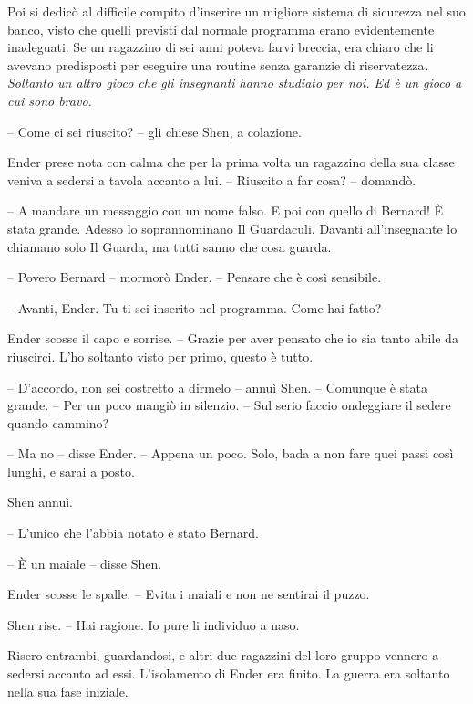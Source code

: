 {Poi si dedicò al difficile compito d'inserire un migliore sistema di
	sicurezza nel suo banco, visto che quelli previsti dal normale programma
	erano evidentemente inadeguati. Se un ragazzino di sei anni poteva farvi
	breccia, era chiaro che li avevano predisposti per eseguire una routine
	senza garanzie di riservatezza. \emph{Soltanto un altro gioco che gli
		insegnanti hanno studiato per noi. Ed è un gioco a cui sono bravo.}}

{-- Come ci sei riuscito? -- gli chiese Shen, a colazione.}

{Ender prese nota con calma che per la prima volta un ragazzino della
	sua classe veniva a sedersi a tavola accanto a lui. -- Riuscito a far
	cosa? -- domandò.}

{-- A mandare un messaggio con un nome falso. E poi con quello di
	Bernard! È stata grande. Adesso lo soprannominano Il Guardaculi. Davanti
	all'insegnante lo chiamano solo Il Guarda, ma tutti sanno che cosa
	guarda.}

{-- Povero Bernard -- mormorò Ender. -- Pensare che è così sensibile.}

{-- Avanti, Ender. Tu ti sei inserito nel programma. Come hai fatto?}

{Ender scosse il capo e sorrise. -- Grazie per aver pensato che io sia
	tanto abile da riuscirci. L'ho soltanto visto per primo, questo è
	tutto.}

{-- D'accordo, non sei costretto a dirmelo -- annuì Shen. -- Comunque è
	stata grande. -- Per un poco mangiò in silenzio. -- Sul serio faccio
	ondeggiare il sedere quando cammino?}

{-- Ma no -- disse Ender. -- Appena un poco. Solo, bada a non fare quei
	passi così lunghi, e sarai a posto.}

{Shen annuì.}

{-- L'unico che l'abbia notato è stato Bernard.}

{-- È un maiale -- disse Shen.}

{Ender scosse le spalle. -- Evita i maiali e non ne sentirai il puzzo.}

{Shen rise. -- Hai ragione. Io pure li individuo a naso.}

{Risero entrambi, guardandosi, e altri due ragazzini del loro gruppo
	vennero a sedersi accanto ad essi. L'isolamento di Ender era finito. La
	guerra era soltanto nella sua fase iniziale.}

\label{Orsonux20Scottux20Cardux20-ux20Ilux20Giocoux20Diux20Enderux20-ux20BY_SLY70A1_split_008.htm}{}

